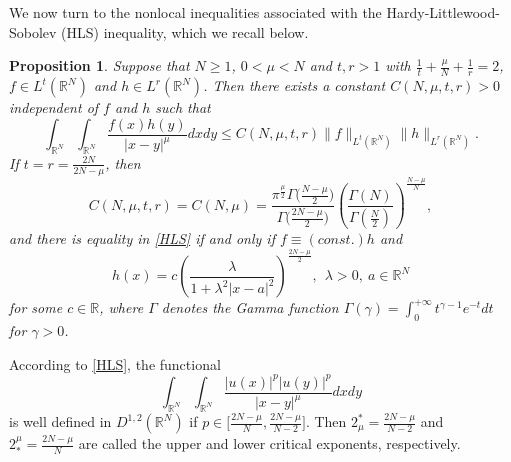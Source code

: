 \documentclass[11pt]{article}
\newtheorem{proposition}{Proposition}[section]
\begin{document}
We now turn to the nonlocal inequalities associated with the Hardy-Littlewood-Sobolev (HLS) inequality, which we recall below.
\begin{proposition} \cite[Theorem 4.3]{LL01}
Suppose that  $N\geq 1$, $0<\mu< N$ and $t,r>1$ with $\frac{1}{t}+\frac{\mu}{N}+\frac{1}{r}=2$, $f\in L^{t}(\mathbb{R}^{N})$ and $h\in L^{r}(\mathbb{R}^{N})$. Then there exists a constant ${C}(N,\mu,t,r)>0$ independent of $f$ and $h$ such that
\begin{equation}\label{HLS}
  \displaystyle\int_{\mathbb{R}^N}\int_{\mathbb{R}^N}\frac{f(x)h(y)}{|x-y|^\mu}dxdy\leq C(N,\mu,t,r)\|f\|_{L^t(\mathbb{R}^N)}\|h\|_{L^r(\mathbb{R}^N)}.
\end{equation}
If $t=r=\frac{2N}{2N-\mu}$, then
\begin{equation*}%
  {C}(N,\mu,t,r)=C(N,\mu)=\frac{\pi^{\frac{\mu}{2}}\Gamma\big(\frac{N-\mu}{2}\big)}{\Gamma\big(
  \frac{2N-\mu}{2}\big)}\left(\frac{\Gamma(N)}{\Gamma(\frac{N}{2})}\right)^{\frac{N-\mu}{N}},
\end{equation*}
and there is equality in \eqref{HLS} if and only if $f\equiv (const.)h$ and
\begin{equation*}
  h(x)=c\left(\frac{\lambda}{1+\lambda^{2}|x-a|^{2}}\right)
^{\frac{2N-\mu}{2}},~~\lambda>0,~a\in\mathbb{R}^{N}%
\end{equation*}
for some $c\in \mathbb{R}$, %
where
$\Gamma$ denotes the Gamma function $\Gamma(\gamma)=\int_0^{+\infty}t^{\gamma-1}e^{-t}dt$ for $\gamma>0$.
\end{proposition}
According to \eqref{HLS}, the functional
\begin{equation*}
  \int_{\mathbb{R}^{N}}\int_{\mathbb{R}^{N}} \frac{|u(x)|^p|u(y)|^p}{|x-y|^\mu}dxdy
\end{equation*}
is well defined in $D^{1,2}(\mathbb{R}^{N})$ if $p\in\big[\frac{2N-\mu}{N},\frac{2N-\mu}{N-2}\big]$. Then $2^{\ast}_{\mu}=\frac{2N-\mu}{N-2}$ and  $2_{\ast}^{\mu}=\frac{2N-\mu}{N}$ are called the upper and lower critical exponents, respectively.
\end{document}
